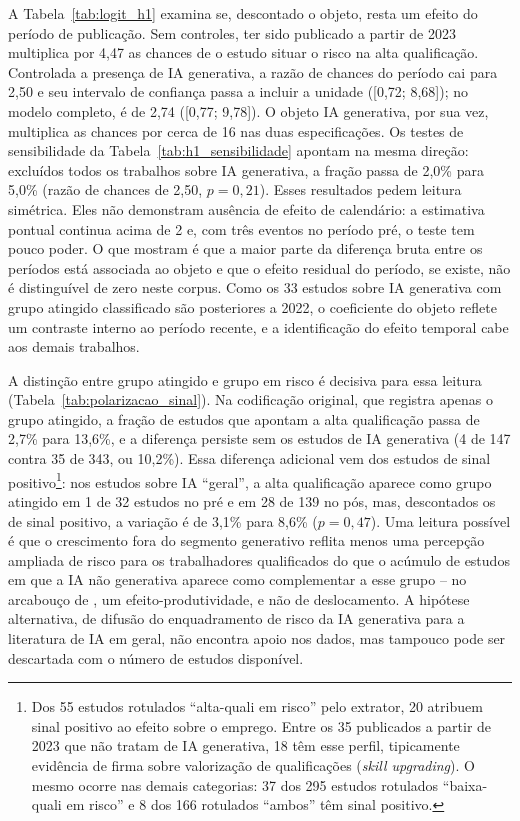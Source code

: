 \begin{table}[htbp]
\centering
\caption{Determinantes de o estudo situar o risco na alta qualificação (logit).}
\label{tab:logit_h1}
{\small}
\end{table}

A Tabela~\ref{tab:logit_h1} examina se, descontado o objeto, resta um efeito do período de publicação. Sem controles, ter sido publicado a partir de 2023 multiplica por 4,47 as chances de o estudo situar o risco na alta qualificação. Controlada a presença de IA generativa, a razão de chances do período cai para 2,50 e seu intervalo de confiança passa a incluir a unidade ([0,72; 8,68]); no modelo completo, é de 2,74 ([0,77; 9,78]). O objeto IA generativa, por sua vez, multiplica as chances por cerca de 16 nas duas especificações. Os testes de sensibilidade da Tabela~\ref{tab:h1_sensibilidade} apontam na mesma direção: excluídos todos os trabalhos sobre IA generativa, a fração passa de 2,0\% para 5,0\% (razão de chances de 2,50, $p = 0{,}21$). Esses resultados pedem leitura simétrica. Eles não demonstram ausência de efeito de calendário: a estimativa pontual continua acima de 2 e, com três eventos no período pré, o teste tem pouco poder. O que mostram é que a maior parte da diferença bruta entre os períodos está associada ao objeto e que o efeito residual do período, se existe, não é distinguível de zero neste corpus. Como os 33 estudos sobre IA generativa com grupo atingido classificado são posteriores a 2022, o coeficiente do objeto reflete um contraste interno ao período recente, e a identificação do efeito temporal cabe aos demais trabalhos.

A distinção entre grupo atingido e grupo em risco é decisiva para essa leitura (Tabela~\ref{tab:polarizacao_sinal}). Na codificação original, que registra apenas o grupo atingido, a fração de estudos que apontam a alta qualificação passa de 2,7\% para 13,6\%, e a diferença persiste sem os estudos de IA generativa (4 de 147 contra 35 de 343, ou 10,2\%). Essa diferença adicional vem dos estudos de sinal positivo\footnote{Dos 55 estudos rotulados ``alta-quali em risco'' pelo extrator, 20 atribuem sinal positivo ao efeito sobre o emprego. Entre os 35 publicados a partir de 2023 que não tratam de IA generativa, 18 têm esse perfil, tipicamente evidência de firma sobre valorização de qualificações (\emph{skill upgrading}). O mesmo ocorre nas demais categorias: 37 dos 295 estudos rotulados ``baixa-quali em risco'' e 8 dos 166 rotulados ``ambos'' têm sinal positivo.}: nos estudos sobre IA ``geral'', a alta qualificação aparece como grupo atingido em 1 de 32 estudos no pré e em 28 de 139 no pós, mas, descontados os de sinal positivo, a variação é de 3,1\% para 8,6\% ($p = 0{,}47$). Uma leitura possível é que o crescimento fora do segmento generativo reflita menos uma percepção ampliada de risco para os trabalhadores qualificados do que o acúmulo de estudos em que a IA não generativa aparece como complementar a esse grupo -- no arcabouço de \textcite{acemogluRestrepo2019}, um efeito-produtividade, e não de deslocamento. A hipótese alternativa, de difusão do enquadramento de risco da IA generativa para a literatura de IA em geral, não encontra apoio nos dados, mas tampouco pode ser descartada com o número de estudos disponível.

